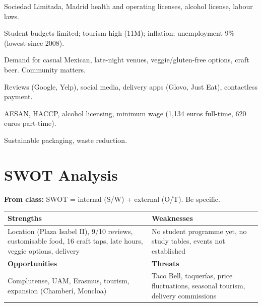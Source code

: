 \documentclass[11pt,a4paper]{article}
\begin{document}
\begin{description}[leftmargin=2.5em,style=nextline]
\item[Political] Sociedad Limitada, Madrid health and operating licenses, alcohol license, labour laws.
\item[Economic] Student budgets limited; tourism high (11M); inflation; unemployment 9\% (lowest since 2008).
\item[Social] Demand for casual Mexican, late-night venues, veggie/gluten-free options, craft beer. Community matters.
\item[Technological] Reviews (Google, Yelp), social media, delivery apps (Glovo, Just Eat), contactless payment.
\item[Legal] AESAN, HACCP, alcohol licensing, minimum wage (1,134 euros full-time, 620 euros part-time).
\item[Environmental] Sustainable packaging, waste reduction.
\end{description}

\vspace{1em}

\section{SWOT Analysis}\label{sec:swot}

\textbf{From class:} SWOT = internal (S/W) + external (O/T). Be specific.

\begin{center}
\small
\begin{tabular}{@{}p{5.2cm}p{5.2cm}@{}}
\toprule
\rowcolor{lightorange}
\textbf{Strengths} & \textbf{Weaknesses} \\
\midrule
Location (Plaza Isabel II), 9/10 reviews, customisable food, 16 craft taps, late hours, veggie options, delivery & No student programme yet, no study tables, events not established \\
\addlinespace
\rowcolor{lightorange}
\textbf{Opportunities} & \textbf{Threats} \\
\midrule
Complutense, UAM, Erasmus, tourism, expansion (Chamber\'i, Moncloa) & Taco Bell, taquer\'ias, price fluctuations, seasonal tourism, delivery commissions \\
\bottomrule
\end{tabular}
\end{center}

\vspace{1em}

\end{document}
